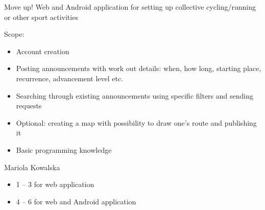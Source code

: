 \begin{project}
{Move up!}
{Web and Android application for setting up collective cycling/running or other sport activities} 
{
Scope:
\begin{itemize}
	\item Account creation
	\item Posting announcements with work out details: when, how long, starting place, recurrence, advancement level etc.
	\item Searching through existing announcements using specific filters and sending requests
	\item Optional: creating a map with possibility to draw one’s route and publishing it
\end{itemize}
}
{
\begin{itemize}
	\item Basic programming knowledge
\end{itemize}
}
{Mariola Kowalska}
{
\begin{itemize}
	\item 1 – 3 for web application
	\item 4 – 6 for web and Android application
\end{itemize}
}
\end{project}
